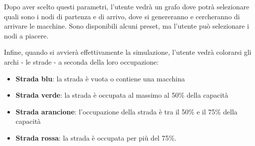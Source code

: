 \documentclass[main.tex]{subfiles}
\begin{document}



Dopo aver scelto questi parametri, l'utente vedrà un grafo dove potrà selezionare quali sono i nodi di partenza e di arrivo, dove si genereranno e cercheranno di arrivare le macchine. Sono disponibili alcuni preset, ma l'utente può selezionare i nodi a piacere. 

Infine, quando si avvierà effettivamente la simulazione, l'utente vedrà colorarsi gli archi - le strade - a seconda della loro occupazione:
\begin{itemize}
    \item \textbf{Strada blu}: la strada è vuota o contiene una macchina
    \item \textbf{Strada verde}: la strada è occupata al massimo al 50\% della capacità
    \item \textbf{Strada arancione}: l'occupazione della strada è tra il 50\% e il 75\% della capacità 
    \item \textbf{Strada rossa}: la strada è occupata per più del 75\%.
\end{itemize}
\end{document}
